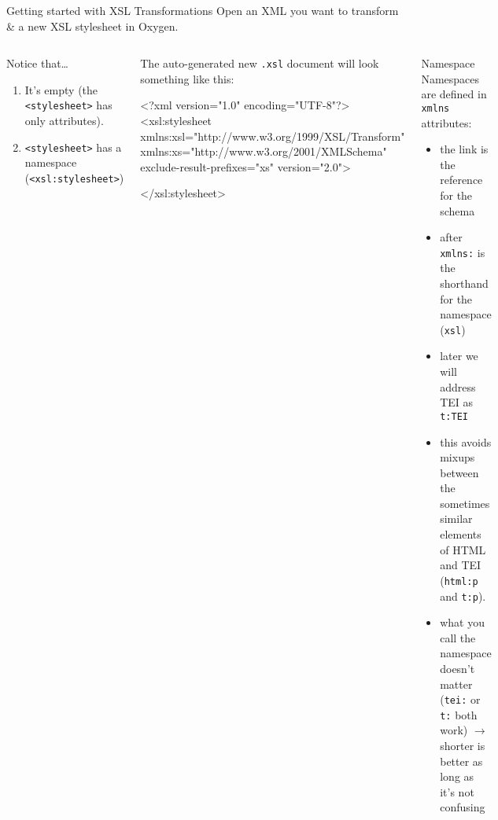 \begin{frame}[fragile]{Getting started with XSL Transformations}
\small
Open an XML you want to transform \& a new XSL stylesheet in Oxygen. 

\begin{columns}
\begin{block}{Notice that\dots}
\footnotesize
\begin{enumerate}
    \item It's empty (the \texttt{<stylesheet>} has only attributes). \item \texttt{<stylesheet>} has a \alert{namespace} (\texttt{<xsl:stylesheet>})
\end{enumerate}
\end{block}

\begin{block}{}
The auto-generated new \texttt{.xsl} document will look something like this:
\begin{xmlcode}
<?xml version="1.0" encoding="UTF-8"?>
<xsl:stylesheet 
  xmlns:xsl="http://www.w3.org/1999/XSL/Transform"
  xmlns:xs="http://www.w3.org/2001/XMLSchema"
  exclude-result-prefixes="xs"
  version="2.0">
    
</xsl:stylesheet>
\end{xmlcode}
\end{block}


\begin{block}{Namespace}\footnotesize
Namespaces are defined in \texttt{xmlns} attributes: 
    \begin{itemize}\scriptsize
        \item the link is the reference for the schema
        \item after \texttt{xmlns:} is the shorthand for the namespace (\texttt{xsl}) 
        \item later we will address TEI as \texttt{t:TEI}
        \item this avoids mixups between the sometimes similar elements of HTML and TEI (\texttt{html:p} and \texttt{t:p}).
        \item what you call the namespace doesn't matter (\texttt{tei:} or \texttt{t:} both work) $\to$ shorter is better as long as it's not confusing
    \end{itemize}
\end{block}

\end{columns}

\end{frame}


